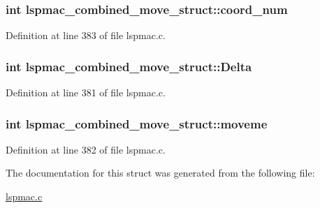 \hypertarget{structlspmac__combined__move__struct_a2ae011832de3009f7a08b3081b51b7a3}{
\subsubsection[{coord\-\_\-num}]{\setlength{\rightskip}{0pt plus 5cm}int lspmac\-\_\-combined\-\_\-move\-\_\-struct\-::coord\-\_\-num}}\label{structlspmac__combined__move__struct_a2ae011832de3009f7a08b3081b51b7a3}


Definition at line 383 of file lspmac.\-c.

\hypertarget{structlspmac__combined__move__struct_a5389f07fcf2b24b0e912aefb4141001d}{
\subsubsection[{Delta}]{\setlength{\rightskip}{0pt plus 5cm}int lspmac\-\_\-combined\-\_\-move\-\_\-struct\-::\-Delta}}\label{structlspmac__combined__move__struct_a5389f07fcf2b24b0e912aefb4141001d}


Definition at line 381 of file lspmac.\-c.

\hypertarget{structlspmac__combined__move__struct_a650f35e534bd22bdb45d5361f75eaae8}{
\subsubsection[{moveme}]{\setlength{\rightskip}{0pt plus 5cm}int lspmac\-\_\-combined\-\_\-move\-\_\-struct\-::moveme}}\label{structlspmac__combined__move__struct_a650f35e534bd22bdb45d5361f75eaae8}


Definition at line 382 of file lspmac.\-c.



The documentation for this struct was generated from the following file\-:\begin{DoxyCompactItemize}
\item 
\hyperlink{lspmac_8c}{lspmac.\-c}\end{DoxyCompactItemize}
